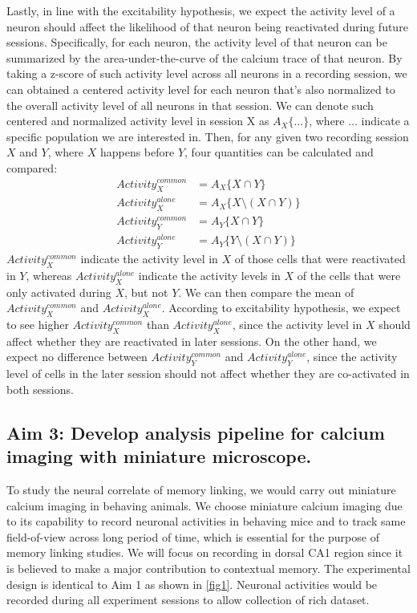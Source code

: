 \documentclass[master.tex]{subfiles}
\begin{document}
Lastly, in line with the excitability hypothesis, we expect the activity level
of a neuron should affect the likelihood of that neuron being reactivated during
future sessions. Specifically, for each neuron, the activity level of that
neuron can be summarized by the area-under-the-curve of the calcium trace of
that neuron. By taking a z-score of such activity level across all neurons in a
recording session, we can obtained a centered activity level for each neuron
that's also normalized to the overall activity level of all neurons in that
session. We can denote such centered and normalized activity level in session X
as $A_X\{\ldots\}$, where $\ldots$ indicate a specific population we are
interested in. Then, for any given two recording session $X$ and $Y$, where $X$
happens before $Y$, four quantities can be calculated and compared:
\begin{align*}
  Activity_{X}^{common} & = A_X\{X \cap Y\} \\
  Activity_{X}^{alone} & = A_X\{X \setminus (X \cap Y)\} \\
  Activity_{Y}^{common} & = A_Y\{X \cap Y\} \\
  Activity_{Y}^{alone} & = A_Y\{Y \setminus (X \cap Y)\}
\end{align*}
$Activity_{X}^{common}$ indicate the activity level in $X$ of those cells that
were reactivated in $Y$, whereas $Activity_{X}^{alone}$ indicate the activity
levels in $X$ of the cells that were only activated during $X$, but not $Y$. We
can then compare the mean of $Activity_{X}^{common}$ and $Activity_{X}^{alone}$.
According to excitability hypothesis, we expect to see higher
$Activity_{X}^{common}$ than $Activity_{X}^{alone}$, since the activity level in
$X$ should affect whether they are reactivated in later sessions. On the other
hand, we expect no difference between $Activity_{Y}^{common}$ and
$Activity_{Y}^{alone}$, since the activity level of cells in the later session should not
affect whether they are co-activated in both sessions.

\subsection*{Aim 3: Develop analysis pipeline for calcium imaging with miniature
  microscope.}

To study the neural correlate of memory linking, we would carry out miniature
calcium imaging in behaving animals. We choose miniature calcium imaging due to
its capability to record neuronal activities in behaving mice and to track same
field-of-view across long period of time, which is essential for the purpose of
memory linking studies. We will focus on recording in dorsal CA1 region since it
is believed to make a major contribution to contextual memory. The experimental
design is identical to Aim 1 as shown in \autoref{fig1}. Neuronal activities
would be recorded during all experiment sessions to allow collection of rich
dataset.
\end{document}
